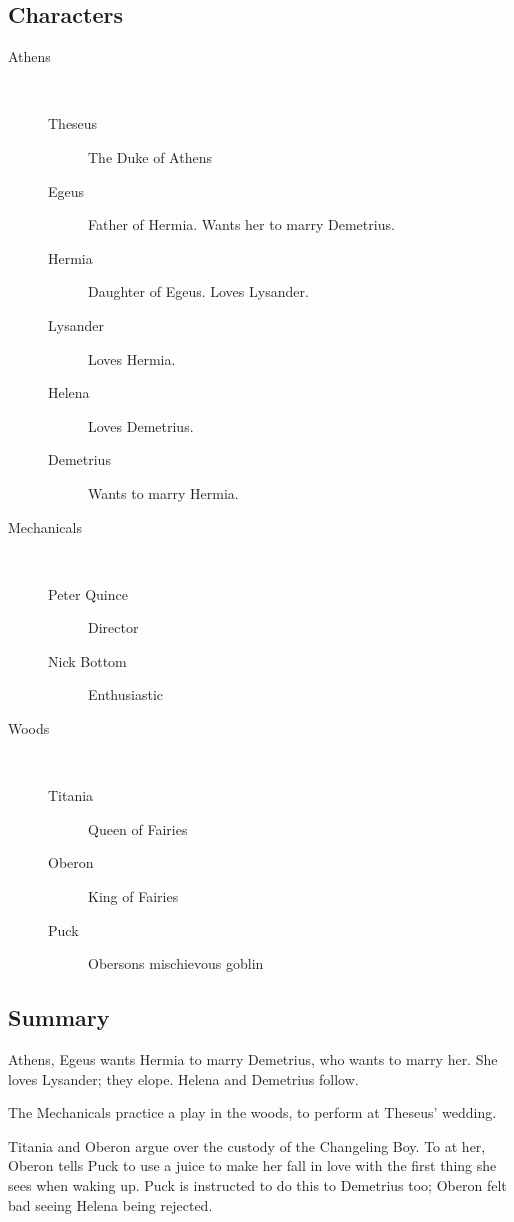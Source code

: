\documentclass{article}
\begin{document}
\subsection{Characters}
\begin{description} 
\item[Athens]~
\begin{description}
 \item[Theseus] The Duke of Athens
 \item[Egeus] Father of Hermia. Wants her to marry Demetrius.
 \item[Hermia] Daughter of Egeus. Loves Lysander.
 \item[Lysander] Loves Hermia.
 \item[Helena] Loves Demetrius.
 \item[Demetrius] Wants to marry Hermia. 
\end{description}
 
\item[Mechanicals]~
\begin{description}
 \item[Peter Quince] Director
 \item[Nick Bottom] Enthusiastic
\end{description}
 
\item[Woods]~
\begin{description}
 \item[Titania] Queen of Fairies
 \item[Oberon] King of Fairies
 \item[Puck] Obersons mischievous goblin
\end{description}
 
\end{description} 
 
\subsection{Summary} 
Athens, Egeus wants Hermia to marry Demetrius, who wants to marry her. She loves Lysander; they elope. Helena and Demetrius follow.
 
The Mechanicals practice a play in the woods, to perform at Theseus' wedding. 
 
Titania and Oberon argue over the custody of the Changeling Boy. To  at her, Oberon tells Puck to use a juice to make her fall in love with the first thing she sees when waking up. Puck is instructed to do this to Demetrius too; Oberon felt bad seeing Helena being rejected.
 
\end{document}
